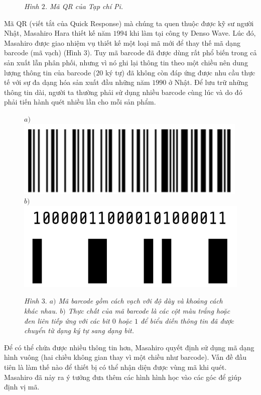 \begin{multicols}{2}
\begin{figure}[H]
			\caption{\small\textit{\color{toanhocdoisong}Hình $2$. Mã QR của Tạp chí Pi.}}
			\vspace*{-10pt}
		\end{figure}
	Mã QR (viết tắt của Quick Response) mà chúng ta quen thuộc được kỹ sư người Nhật, Masahiro Hara thiết kế năm $1994$ khi làm tại công ty Denso Wave. Lúc đó, Masahiro được giao nhiệm vụ thiết kế một loại mã mới để thay thế mã dạng barcode (mã vạch) (Hình $3$). Tuy mã barcode đã được dùng rất phổ biến trong cả sản xuất lẫn phân phối, nhưng vì nó ghi lại thông tin theo một chiều nên dung lượng thông tin của barcode ($20$ ký tự) đã không còn đáp ứng được nhu cầu thực tế với sự đa dạng hóa sản xuất đầu những năm $1990$ ở Nhật. Để lưu trữ những thông tin dài, người ta thường phải sử dụng nhiều barcode cùng lúc và do đó phải tiến hành quét nhiều lần cho mỗi sản phẩm.
	\begin{figure}[H]
		\vspace*{-10pt}
		\centering
		\captionsetup{labelformat= empty, justification=centering}
		$a)$\includegraphics[width= 0.8\linewidth]{4}
		$b)$\includegraphics[width= 0.8\linewidth]{5}
		\caption{\small\textit{\color{toanhocdoisong}Hình $3.$ $a)$ Mã barcode gồm cách vạch với độ dày và khoảng cách khác nhau. $b)$ Thực chất của mã barcode là các cột màu trắng hoặc đen liên tiếp ứng với các bit $0$ hoặc $1$ để biểu diễn thông tin đã được chuyển từ dạng ký tự sang dạng bit.}}
		\vspace*{-10pt}
	\end{figure}
	Để có thể chứa được nhiều thông tin hơn, Masahiro quyết định sử dụng mã dạng hình vuông (hai chiều không gian thay vì một chiều như barcode). Vấn đề đầu tiên là làm thế nào để thiết bị có thể nhận diện được vùng mã khi quét. Masahiro đã nảy ra ý tưởng đưa thêm các hình hình học vào các góc để giúp định vị mã.

\end{multicols}
